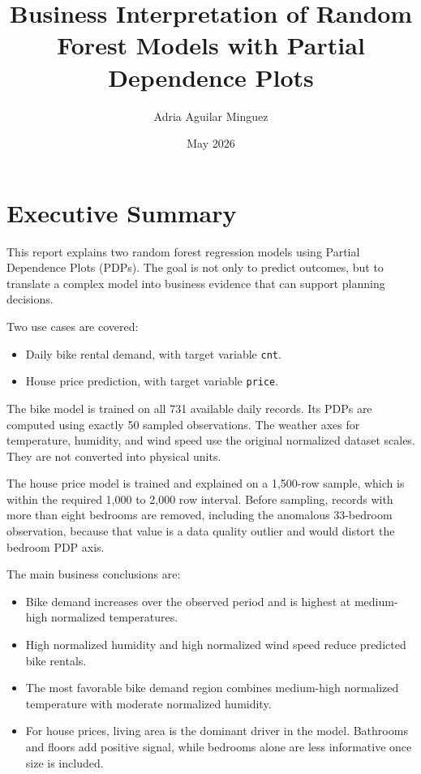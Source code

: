 \documentclass[11pt,a4paper]{article}
\title{Business Interpretation of Random Forest Models with Partial Dependence Plots}
\author{Adria Aguilar Minguez}
\date{May 2026}
\begin{document}
\maketitle

\section{Executive Summary}

This report explains two random forest regression models using Partial Dependence Plots (PDPs). The goal is not only to predict outcomes, but to translate a complex model into business evidence that can support planning decisions.

Two use cases are covered:
\begin{itemize}
    \item Daily bike rental demand, with target variable \texttt{cnt}.
    \item House price prediction, with target variable \texttt{price}.
\end{itemize}

The bike model is trained on all 731 available daily records. Its PDPs are computed using exactly 50 sampled observations. The weather axes for temperature, humidity, and wind speed use the original normalized dataset scales. They are not converted into physical units.

The house price model is trained and explained on a 1,500-row sample, which is within the required 1,000 to 2,000 row interval. Before sampling, records with more than eight bedrooms are removed, including the anomalous 33-bedroom observation, because that value is a data quality outlier and would distort the bedroom PDP axis.

The main business conclusions are:
\begin{itemize}
    \item Bike demand increases over the observed period and is highest at medium-high normalized temperatures.
    \item High normalized humidity and high normalized wind speed reduce predicted bike rentals.
    \item The most favorable bike demand region combines medium-high normalized temperature with moderate normalized humidity.
    \item For house prices, living area is the dominant driver in the model. Bathrooms and floors add positive signal, while bedrooms alone are less informative once size is included.
\end{itemize}
\end{document}
